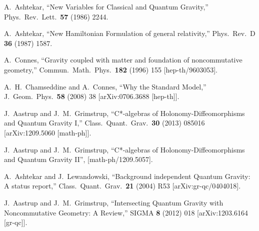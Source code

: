 \documentclass[12pt]{article}
\begin{document}
\begin{thebibliography}{99}



\raggedright

  A.~Ashtekar,
  ``New Variables for Classical and Quantum Gravity,''
  Phys.\ Rev.\ Lett.\  {\bf 57} (1986) 2244.

  A.~Ashtekar,
  ``New Hamiltonian Formulation of general relativity,''
  Phys.\ Rev.\  D {\bf 36} (1987) 1587.




  A.~Connes,
  ``Gravity coupled with matter and foundation of noncommutative geometry,''
  Commun.\ Math.\ Phys.\  {\bf 182} (1996) 155
  [hep-th/9603053].



  A.~H.~Chamseddine and A.~Connes,
  ``Why the Standard Model,''
  J.\ Geom.\ Phys.\  {\bf 58} (2008) 38
  [arXiv:0706.3688 [hep-th]].







  J.~Aastrup and J.~M.~Grimstrup,
  ``C*-algebras of Holonomy-Diffeomorphisms and Quantum Gravity I,''
  Class.\ Quant.\ Grav.\  {\bf 30} (2013) 085016
  [arXiv:1209.5060 [math-ph]].


  J.~Aastrup and J.~M.~Grimstrup,
  ``C*-algebras of Holonomy-Diffeomorphisms and Quantum Gravity II'',
 [math-ph/1209.5057].






  A.~Ashtekar and J.~Lewandowski,
  ``Background independent Quantum Gravity: A status report,''
  Class.\ Quant.\ Grav.\  {\bf 21} (2004) R53
  [arXiv:gr-qc/0404018].





  J.~Aastrup and J.~M.~Grimstrup,
  ``Intersecting Quantum Gravity with Noncommutative Geometry: A Review,''
  SIGMA {\bf 8} (2012) 018
  [arXiv:1203.6164 [gr-qc]].



\end{thebibliography}
\end{document}
